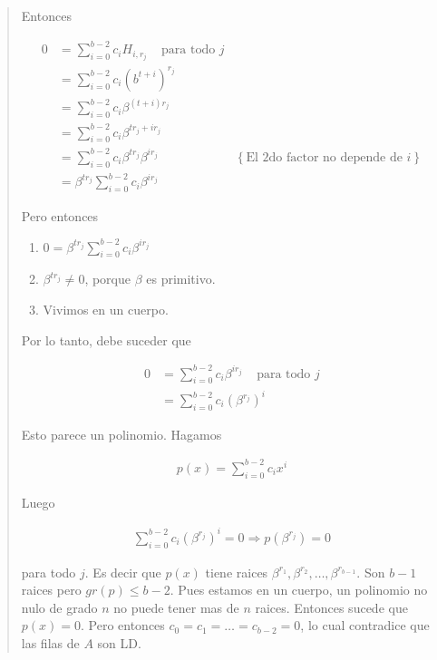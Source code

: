 \documentclass[a4paper]{article}
\begin{document}
\begin{quote}
    Entonces 

    \begin{align*}
        0 &= \sum_{i=0}^{b-2} c_i H_{i, r_j} ~ ~ ~ ~ ~ \text{para todo } j \\ 
          &= \sum_{i=0}^{b-2} c_i \left( b^{t+i} \right)^{r_j} \\ 
          &= \sum_{i=0}^{b-2} c_i \beta^{(t+i)r_j} \\ 
          &= \sum_{i=0}^{b-2} c_i \beta^{tr_j + i r_j} \\ 
          &= \sum_{i=0}^{b-2} c_i \beta^{t r_j} \beta^{ir_j} &\left\{ \text{El 2do factor no depende de $i$} \right\} \\  
          &= \beta^{tr_j} \sum_{i=0}^{b-2} c_i \beta^{i r_j}
    \end{align*}

    Pero entonces 

    \begin{enumerate}
        \item $0 = \beta^{t r_j} \sum_{i=0}^{b-2} c_i \beta^{i r_j}$ 
        \item $\beta^{t r_j} \neq 0$, porque $\beta$ es primitivo. 
        \item Vivimos en un cuerpo.
    \end{enumerate}

    Por lo tanto, debe suceder que 

    \begin{align*}
        0 &= \sum_{i=0}^{b-2} c_i \beta^{i r_j} ~ ~ ~ ~  ~ \text{para todo } j \\
          &=\sum_{i=0}^{b-2} c_i \left( \beta^{r_j} \right)^{i}
    \end{align*}

    Esto parece un polinomio. Hagamos 

    \begin{align*}
        p(x) = \sum_{i=0}^{b-2} c_i x^i
    \end{align*}

    Luego

    \begin{align*}
        \sum_{i=0}^{b-2} c_i \left( \beta^{r_j} \right)^{i} = 0 \Rightarrow p(\beta^{r_j}) = 0
    \end{align*}

    para todo $j$. Es decir que $p(x)$ tiene raices $\beta^{r_1}, \beta^{r_2},
    \ldots, \beta^{r_{b - 1}}$. Son $b-1$ raices pero $gr(p) \leq b - 2$.
    Pues estamos en un cuerpo, un polinomio no nulo de grado $n$ no 
    puede tener mas de $n$ raices. Entonces sucede que $p(x) = 0$.
    Pero entonces $c_0 = c_1 = \ldots = c_{b-2} = 0$, lo cual
    contradice que las filas de $A$ son LD.






    

\end{quote}
\normalsize
\end{document}
